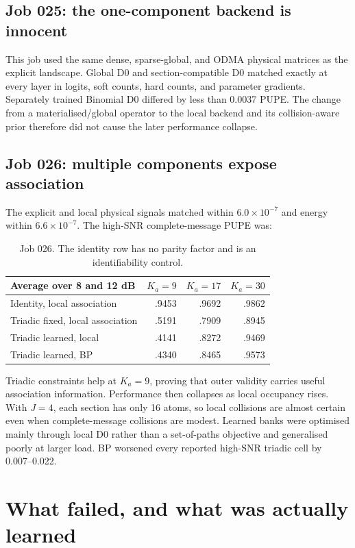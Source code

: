 \documentclass[11pt]{article}
\begin{document}
\subsection{Job 025: the one-component backend is innocent}

This job used the same dense, sparse-global, and ODMA physical matrices as the explicit landscape. Global D0 and
section-compatible D0 matched exactly at every layer in logits, soft counts, hard counts, and parameter gradients.
Separately trained Binomial D0 differed by less than 0.0037 PUPE. The change from a materialised/global operator to the
local backend and its collision-aware prior therefore did not cause the later performance collapse.

\subsection{Job 026: multiple components expose association}

The explicit and local physical signals matched within $6.0\times10^{-7}$ and energy within $6.6\times10^{-7}$. The
high-SNR complete-message PUPE was:
\begin{table}[h]
\centering
\small
\begin{tabular}{@{}lrrr@{}}
\toprule
Average over 8 and 12 dB & $K_a=9$ & $K_a=17$ & $K_a=30$ \\
\midrule
Identity, local association & .9453 & .9692 & .9862 \\
Triadic fixed, local association & .5191 & .7909 & .8945 \\
Triadic learned, local & .4141 & .8272 & .9469 \\
Triadic learned, BP & .4340 & .8465 & .9573 \\
\bottomrule
\end{tabular}
\caption{Job 026. The identity row has no parity factor and is an identifiability control.}
\end{table}

Triadic constraints help at $K_a=9$, proving that outer validity carries useful association information. Performance
then collapses as local occupancy rises. With $J=4$, each section has only 16 atoms, so local collisions are almost
certain even when complete-message collisions are modest. Learned banks were optimised mainly through local D0 rather
than a set-of-paths objective and generalised poorly at larger load. BP worsened every reported high-SNR triadic cell by
0.007--0.022.

\section{What failed, and what was actually learned}
\end{document}
